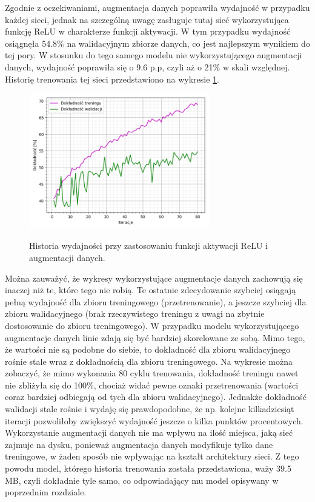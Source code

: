 Zgodnie z oczekiwaniami, augmentacja danych poprawiła wydajność w przypadku każdej sieci, jednak na szczególną uwagę zasługuje tutaj sieć wykorzystująca funkcję ReLU w charakterze funkcji aktywacji. W tym przypadku wydajność osiągnęła 54.8\% na walidacyjnym zbiorze danych, co jest najlepszym wynikiem do tej pory. W stosunku do tego samego modelu nie wykorzystującego augmentacji danych, wydajność poprawiła się o 9.6 p.p, czyli aż o 21\% w skali względnej. Historię trenowania tej sieci przedstawiono na wykresie \ref{pic:5.4}. 
\begin{figure}[H]
    \caption{Historia wydajności przy zastosowaniu funkcji aktywacji ReLU i augmentacji danych.}
    \centering
    \includegraphics[width=0.7\textwidth]{wykres4.png}
    \label{pic:5.4}
\end{figure}
Można zauważyć, że wykresy wykorzystujące augmentacje danych zachowują się inaczej niż te, które tego nie robią. Te ostatnie zdecydowanie szybciej osiągają pełną wydajność dla zbioru treningowego (przetrenowanie), a jeszcze szybciej dla zbioru walidacyjnego (brak rzeczywistego treningu z uwagi na zbytnie dostosowanie do zbioru treningowego). W przypadku modelu wykorzystującego augmentacje danych linie zdają się być bardziej skorelowane ze sobą. Mimo tego, że wartości nie są podobne do siebie, to dokładność dla zbioru walidacyjnego rośnie stale wraz z dokładnością dla zbioru treningowego. Na wykresie można zobaczyć, że mimo wykonania 80 cyklu trenowania, dokładność treningu nawet nie zbliżyła się do 100\%, chociaż widać pewne oznaki przetrenowania (wartości coraz bardziej odbiegają od tych dla zbioru walidacyjnego). Jednakże dokładność walidacji stale rośnie i wydaję się prawdopodobne, że np. kolejne kilkadziesiąt iteracji pozwoliłoby zwiększyć wydajność jeszcze o kilka punktów procentowych. Wykorzystanie augmentacji danych nie ma wpływu na ilość miejsca, jaką sieć zajmuje na dysku, ponieważ augmentacja danych modyfikuje tylko dane treningowe, w żaden sposób nie wpływając na kształt architektury sieci. Z tego powodu model, którego historia trenowania została przedstawiona, waży 39.5 MB, czyli dokładnie tyle samo, co odpowiadający mu model opisywany w poprzednim rozdziale.

